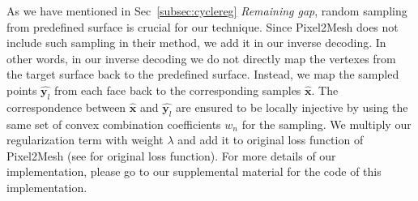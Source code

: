 As we have mentioned in Sec~\ref{subsec:cyclereg} \emph{Remaining gap}, random sampling from predefined surface is crucial for our technique. Since Pixel2Mesh does not include such sampling in their method, we add it in our inverse decoding. In other words, in our inverse decoding we do not directly map the vertexes from the target surface back to the predefined surface. Instead, we map the sampled points $\hat{\mathbf{y}_l}$ from each face back to the corresponding samples $\hat{\mathbf{x}}$. The correspondence between $\hat{\mathbf{x}}$ and $\hat{\mathbf{y}_l}$ are ensured to be locally injective by using the same set of convex combination coefficients $w_n$ for the sampling. We multiply our regularization term with weight $\lambda$ and add it to original loss function of Pixel2Mesh (see \cite{pixel2mesh} for original loss function). For more details of our implementation, please go to our supplemental material for the code of this implementation.
